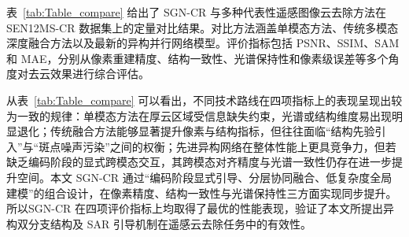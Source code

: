 表~\ref{tab:Table_compare} 给出了 SGN-CR 与多种代表性遥感图像云去除方法在 SEN12MS-CR 数据集上的定量对比结果。对比方法涵盖单模态方法、传统多模态深度融合方法以及最新的异构并行网络模型。评价指标包括 PSNR、SSIM、SAM 和 MAE，分别从像素重建精度、结构一致性、光谱保持性和像素级误差等多个角度对去云效果进行综合评估。

从表~\ref{tab:Table_compare} 可以看出，不同技术路线在四项指标上的表现呈现出较为一致的规律：单模态方法在厚云区域受信息缺失约束，光谱或结构维度易出现明显退化；传统融合方法能够显著提升像素与结构指标，但往往面临“结构先验引入”与“斑点噪声污染”之间的权衡；先进异构网络在整体性能上更具竞争力，但若缺乏编码阶段的显式跨模态交互，其跨模态对齐精度与光谱一致性仍存在进一步提升空间。本文 SGN-CR 通过“编码阶段显式引导、分层协同融合、低复杂度全局建模”的组合设计，在像素精度、结构一致性与光谱保持性三方面实现同步提升。所以SGN-CR 在四项评价指标上均取得了最优的性能表现，验证了本文所提出异构双分支结构及 SAR 引导机制在遥感云去除任务中的有效性。

